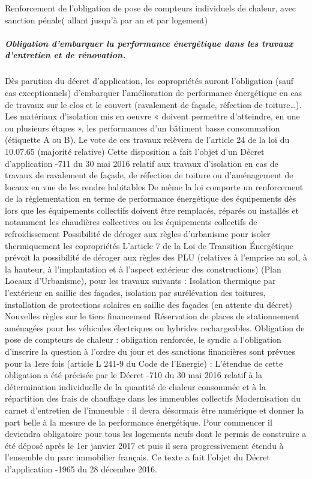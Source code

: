 			Renforcement de l’obligation de pose de compteurs individuels de chaleur, avec sanction pénale( allant jusqu’à  par an et par logement)
			
			\subparagraph{Obligation d’embarquer la performance énergétique dans les travaux d’entretien et de rénovation.}
			Dès parution du décret d’application, les copropriétés auront l’obligation (sauf cas exceptionnels) d’embarquer l’amélioration de performance énergétique en cas de travaux sur le clos et le couvert (ravalement de façade, réfection de toiture…). Les matériaux d’isolation mis en oeuvre « doivent permettre d’atteindre, en une ou plusieurs étapes », les performances d’un bâtiment basse consommation (étiquette A ou B). Le vote de ces travaux relèvera de l’article 24 de la loi du 10.07.65 (majorité relative)
			Cette disposition a fait l’objet d’un Décret d’application -711 du 30 mai 2016 relatif aux travaux d'isolation en cas de travaux de ravalement de façade, de réfection de toiture ou d'aménagement de locaux en vue de les rendre habitables
			De même la loi comporte un renforcement de la réglementation en terme de performance énergétique des équipements dès lors que les équipements collectifs doivent être remplacés, réparés ou installés et notamment les chaudières collectives ou les équipements collectifs de refroidissement
			Possibilité de déroger aux règles d’urbanisme pour isoler thermiquement les copropriétés
			L’article 7 de la Loi de Transition Énergétique prévoit la possibilité de déroger aux règles des PLU (relatives à l’emprise au sol, à la hauteur, à l’implantation et à l’aspect extérieur des constructions) (Plan Locaux d’Urbanisme), pour les travaux suivants : Isolation thermique par l’extérieur en saillie des façades, isolation par surélévation des toitures, installation de protections solaires en saillie des façades (en attente du décret)
			Nouvelles règles sur le tiers financement
			Réservation de places de stationnement aménagées pour les véhicules électriques ou hybrides rechargeables.
			Obligation de pose de compteurs de chaleur : obligation renforcée, le syndic a l’obligation d’inscrire la question à l’ordre du jour et des sanctions financières sont prévues pour la 1ere fois (article L 241-9 du Code de l’Energie) :
			L’étendue de cette obligation a été précisée par le Décret -710 du 30 mai 2016 relatif à la détermination individuelle de la quantité de chaleur consommée et à la répartition des frais de chauffage dans les immeubles collectifs
			Modernisation du carnet d’entretien de l’immeuble : il devra désormais être numérique et donner la part belle à la mesure de la performance énergétique. Pour commencer il deviendra obligatoire pour tous les logements neufs dont le permis de construire a été déposé après le 1er janvier 2017 et puis il sera progressivement étendu à l’ensemble du parc immobilier français.
			Ce texte a fait l’objet du Décret d’application -1965 du 28 décembre 2016.
			
